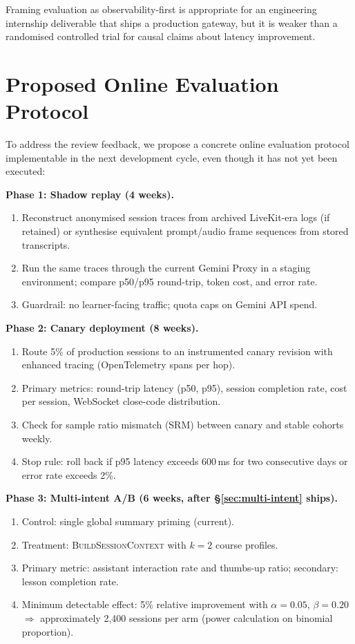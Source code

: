 Framing evaluation as observability-first is appropriate for an engineering internship deliverable that ships a production gateway, but it is weaker than a randomised controlled trial for causal claims about latency improvement.

\section{Proposed Online Evaluation Protocol}
\label{sec:online-protocol}

To address the review feedback, we propose a concrete online evaluation protocol implementable in the next development cycle, even though it has not yet been executed:

\textbf{Phase 1: Shadow replay (4 weeks).}
\begin{enumerate}
    \item Reconstruct anonymised session traces from archived LiveKit-era logs (if retained) or synthesise equivalent prompt/audio frame sequences from stored transcripts.
    \item Run the same traces through the current Gemini Proxy in a staging environment; compare p50/p95 round-trip, token cost, and error rate.
    \item Guardrail: no learner-facing traffic; quota caps on Gemini API spend.
\end{enumerate}

\textbf{Phase 2: Canary deployment (8 weeks).}
\begin{enumerate}
    \item Route 5\% of production sessions to an instrumented canary revision with enhanced tracing (OpenTelemetry spans per hop).
    \item Primary metrics: round-trip latency (p50, p95), session completion rate, cost per session, WebSocket close-code distribution.
    \item Check for sample ratio mismatch (SRM) between canary and stable cohorts weekly.
    \item Stop rule: roll back if p95 latency exceeds 600\,ms for two consecutive days or error rate exceeds 2\%.
\end{enumerate}

\textbf{Phase 3: Multi-intent A/B (6 weeks, after \S\ref{sec:multi-intent} ships).}
\begin{enumerate}
    \item Control: single global summary priming (current).
    \item Treatment: \textsc{BuildSessionContext} with $k=2$ course profiles.
    \item Primary metric: assistant interaction rate and thumbs-up ratio; secondary: lesson completion rate.
    \item Minimum detectable effect: 5\% relative improvement with $\alpha=0.05$, $\beta=0.20$ $\Rightarrow$ approximately 2,400 sessions per arm (power calculation on binomial proportion).
\end{enumerate}

